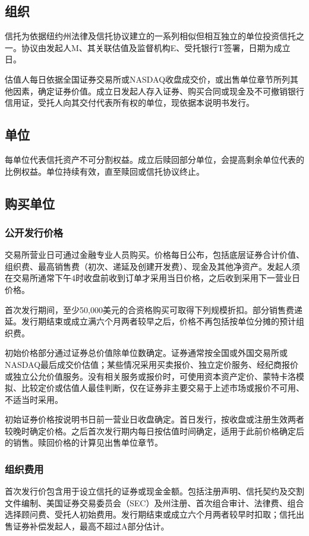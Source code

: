 \documentclass[UTF8,fontset=none,11pt,a4paper]{ctexart}
\begin{document}
\subsection*{组织}
信托为依据纽约州法律及信托协议建立的一系列相似但相互独立的单位投资信托之一。协议由发起人M、其关联估值及监督机构E、受托银行T签署，日期\allowbreak\mbox{为成立日。}


估值人每日依据全国证券交易所或NASDAQ收盘成交价，或出售单位章节所列其他因素，确定证券价值。成立日发起人存入证券、购买合同或现金及不可撤销银行信用证，受托人向其交付代表所有权的单位，现依据本说\allowbreak\mbox{明书发行。}


\subsection*{单位}
每单位代表信托资产不可分割权益。成立后赎回部分单位，会提高剩余单位代表的比例权益。单位持续有效，直至赎回或信托\allowbreak\mbox{协议终止。}


\subsection*{购买单位}
\subsubsection*{公开发行价格}
交易所营业日可通过金融专业人员购买。价格每日公布，包括底层证券合计价值、组织费、最高销售费（初次、递延及创建开发费）、现金及其他净资产。发起人须在交易所通常下午4时收盘前收到订单才采用当日价格，之后收到采用下一营\allowbreak\mbox{业日价格。}


首次发行期间，至少50,000美元的合资格购买可取得下列规模折扣。部分销售费递延。发行期结束或成立满六个月两者较早之后，价格不再包括按单位分摊的预\allowbreak\mbox{计组织费。}


初始价格部分通过证券总价值除单位数确定。证券通常按全国或外国交易所或NASDAQ最后成交价估值；某些情况采用买卖报价、独立定价服务、经纪商报价或独立公允价值服务。没有相关服务或报价时，可使用资本资产定价、蒙特卡洛模拟、比较定价或估值人最佳判断，仅在证券非主要交易于上述市场或报价不可用、不适\allowbreak\mbox{当时采用。}


初始证券价格按说明书日前一营业日收盘确定。首日发行，按收盘或注册生效两者较晚时确定价格。之后首次发行期内每日按估值时间确定，适用于此前价格确定后的销售。赎回价格的计算见出售\allowbreak\mbox{单位章节。}


\subsubsection*{组织费用}
首次发行价包含用于设立信托的证券或现金金额。包括注册声明、信托契约及交割文件编制、美国证券交易委员会（SEC）及州注册、首次组合审计、法律费、组合选择顾问费、受托人初始费用。发行期结束或成立六个月两者较早时扣取；信托出售证券补偿发起人，最高不超过A部\allowbreak\mbox{分估计。}
\end{document}
